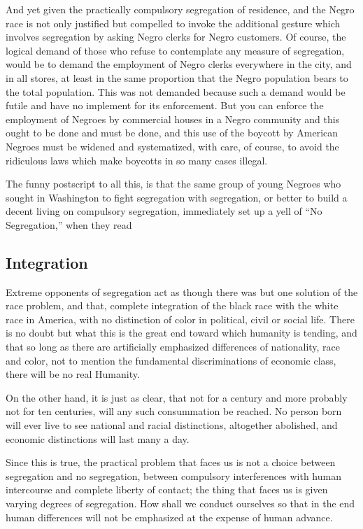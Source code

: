 \documentclass[letterpaper,10pt,english]{jupyterBook}
\begin{document}
\sphinxAtStartPar
And yet given the practically compulsory segregation of residence, and the Negro race is not only justified but compelled to invoke the additional gesture which involves segregation by asking Negro clerks for Negro customers. Of course, the logical demand of those who refuse to contemplate any measure of segregation, would be to demand the employment of Negro clerks everywhere in the city, and in all stores, at least in the same proportion that the Negro population bears to the total population. This was not demanded because such a demand would be futile and have no implement for its enforcement. But you can enforce the employment of Negroes by commercial houses in a Negro community and this ought to be done and must be done, and this use of the boycott by American Negroes must be widened and systematized, with care, of course, to avoid the ridiculous laws which make boycotts in so many cases illegal.

\sphinxAtStartPar
The funny postscript to all this, is that the same group of young Negroes who sought in Washington to fight segregation with segregation, or better to build a decent living on compulsory segregation, immediately set up a yell of “No Segregation,” when they read 


\subsection{Integration}
\label{\detokenize{Volumes/41/04/segregation_in_the_north:integration}}
\sphinxAtStartPar
Extreme opponents of segregation act as though there was but one solution of the race problem, and that, complete integration of the black race with the white race in America, with no distinction of color in political, civil or social life. There is no doubt but what this is the great end toward which humanity is tending, and that so long as there are artificially emphasized differences of nationality, race and color, not to mention the fundamental discriminations of economic class, there will be no real Humanity.

\sphinxAtStartPar
On the other hand, it is just as clear, that not for a century and more probably not for ten centuries, will any such consummation be reached. No person born will ever live to see national and racial distinctions, altogether abolished, and economic distinctions will last many a day.

\sphinxAtStartPar
Since this is true, the practical problem that faces us is not a choice between segregation and no segregation, between compulsory interferences with human intercourse and complete liberty of contact; the thing that faces us is given varying degrees of segregation. How shall we conduct ourselves so that in the end human differences will not be emphasized at the expense of human advance.
\end{document}
